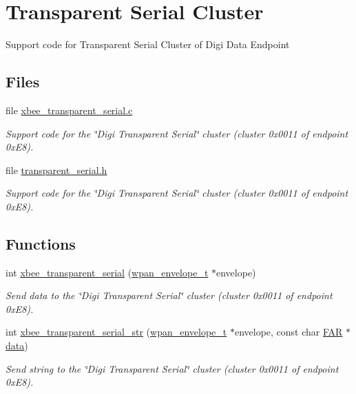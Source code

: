\hypertarget{group__xbee__transparent}{}\section{Transparent Serial Cluster}
\label{group__xbee__transparent}


\begin{DoxyVerb}  Support code for Transparent Serial Cluster of Digi Data Endpoint\end{DoxyVerb}
  


\subsection*{Files}
\begin{DoxyCompactItemize}
\item 
file \hyperlink{xbee__transparent__serial_8c}{xbee\+\_\+transparent\+\_\+serial.\+c}
\begin{DoxyCompactList}\small\item\em Support code for the \char`\"{}\+Digi Transparent Serial\char`\"{} cluster (cluster 0x0011 of endpoint 0x\+E8). \end{DoxyCompactList}\item 
file \hyperlink{transparent__serial_8h}{transparent\+\_\+serial.\+h}
\begin{DoxyCompactList}\small\item\em Support code for the \char`\"{}\+Digi Transparent Serial\char`\"{} cluster (cluster 0x0011 of endpoint 0x\+E8). \end{DoxyCompactList}\end{DoxyCompactItemize}
\subsection*{Functions}
\begin{DoxyCompactItemize}
\item 
int \hyperlink{group__xbee__transparent_gafbf9e5ccdb17be373012bd690a76e570}{xbee\+\_\+transparent\+\_\+serial} (\hyperlink{structwpan__envelope__t}{wpan\+\_\+envelope\+\_\+t} $\ast$envelope)
\begin{DoxyCompactList}\small\item\em Send data to the \char`\"{}\+Digi Transparent Serial\char`\"{} cluster (cluster 0x0011 of endpoint 0x\+E8). \end{DoxyCompactList}\item 
int \hyperlink{group__xbee__transparent_ga93c58cb71320437497c8aa9b3fca3f35}{xbee\+\_\+transparent\+\_\+serial\+\_\+str} (\hyperlink{structwpan__envelope__t}{wpan\+\_\+envelope\+\_\+t} $\ast$envelope, const char \hyperlink{group__hal_gaef060b3456fdcc093a7210a762d5f2ed}{F\+AR} $\ast$\hyperlink{group__xbee__io_gac5955aa1e44ff234e6d78a19cf68f25c}{data})
\begin{DoxyCompactList}\small\item\em Send string to the \char`\"{}\+Digi Transparent Serial\char`\"{} cluster (cluster 0x0011 of endpoint 0x\+E8). \end{DoxyCompactList}\end{DoxyCompactItemize}


